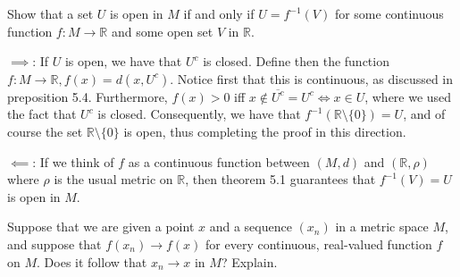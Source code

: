 \begin{exercise}{35}
    Show that a set $U$ is open in $M$ if and only if $U = f^{-1}(V)$ for some continuous function $f: M \rightarrow \mathbb{R}$ and some open set $V$ in $\mathbb{R}$.
\end{exercise}

\begin{solution}
    
    $\implies$: If $U$ is open, we have that $U^c$ is closed.
    Define then the function $f: M \rightarrow \mathbb{R}, f(x) = d(x, U^c)$.
    Notice first that this is continuous, as discussed in preposition 5.4.
    Furthermore, $f(x) > 0$ iff $x \notin \overline{U^c} = U^c \iff x \in U$, where we used the fact that $U^c$ is closed.
    Consequently, we have that $f^{-1}(\mathbb{R} \setminus \{0\}) = U$, and of course the set $\mathbb{R} \setminus \{0\}$ is open, thus completing the proof in this direction.

    $\impliedby$: If we think of $f$ as a continuous function between $(M, d)$ and $(\mathbb{R}, \rho)$ where $\rho$ is the usual metric on $\mathbb{R}$, then theorem 5.1 guarantees that $f^{-1}(V) = U$ is open in $M$.
\end{solution}

\begin{exercise}{36}
    Suppose that we are given a point $x$ and a sequence $(x_n)$ in a metric space $M$, and suppose that $f(x_n) \rightarrow f(x)$ for every continuous, real-valued function $f$ on $M$.
    Does it follow that $x_n \rightarrow x$ in $M$? 
    Explain.
\end{exercise}


